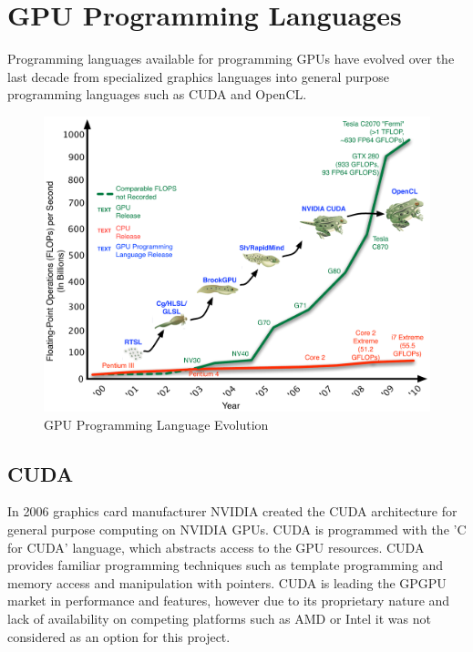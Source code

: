 \section{GPU Programming Languages}

Programming languages available for programming GPUs have evolved over the last
decade from specialized graphics languages into general purpose programming
languages such as CUDA and OpenCL.\cite{Owens2007}

\begin{figure}[!htc]
 		\centering
		\includegraphics[scale=.55]{figures/GPU_Evolution_opencl.pdf}
        \caption{ GPU Programming Language Evolution \cite{Bollig2009} }
        \label{fig:frogs}
\end{figure}



\subsection{CUDA}
In 2006 graphics card manufacturer NVIDIA created the CUDA architecture 
for general purpose computing on NVIDIA GPUs. CUDA is programmed with the 'C
for CUDA' language, which abstracts access to the GPU resources. CUDA provides
familiar programming techniques such as template programming and memory access
and manipulation with pointers. CUDA is leading the GPGPU market in performance
and features, however due to its proprietary nature and lack of availability on
competing platforms such as AMD or Intel it was not considered as an option for
this project.


